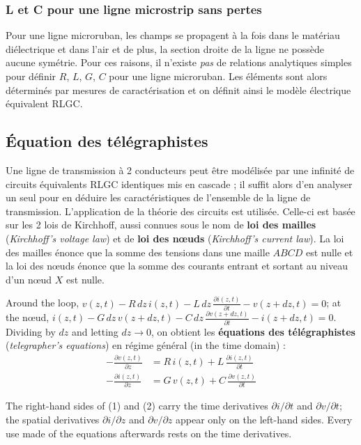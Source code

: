 \subsubsection{L et C pour une ligne microstrip sans pertes}
Pour une ligne microruban, les champs se propagent à la fois dans le matériau
diélectrique et dans l'air et de plus, la section droite de la ligne ne possède
aucune symétrie. Pour ces raisons, il n'existe \emph{pas} de relations
analytiques simples pour définir $R$, $L$, $G$, $C$ pour une ligne microruban.
Les éléments sont alors déterminés par mesures de caractérisation et on définit
ainsi le modèle électrique équivalent RLGC.

\subsection{Équation des télégraphistes}
Une ligne de transmission à 2 conducteurs peut être modélisée par une infinité
de circuits équivalents RLGC identiques mis en cascade ; il suffit alors d'en
analyser un seul pour en déduire les caractéristiques de l'ensemble de la ligne
de transmission. L'application de la théorie des circuits est utilisée.
Celle-ci est basée sur les 2 lois de Kirchhoff, aussi connues sous le nom de
\textbf{loi des mailles} (\textit{Kirchhoff's voltage law}) et de \textbf{loi
des nœuds} (\textit{Kirchhoff's current law}). La loi des mailles énonce que la
somme des tensions dans une maille $ABCD$ est nulle et la loi des nœuds énonce
que la somme des courants entrant et sortant au niveau d'un nœud $X$ est nulle.

Around the loop,
$v(z,t) - R\,dz\,i(z,t) - L\,dz\,\frac{\partial i(z,t)}{\partial t}
- v(z+dz,t) = 0$; at the nœud,
$i(z,t) - G\,dz\,v(z+dz,t) - C\,dz\,\frac{\partial v(z+dz,t)}{\partial t}
- i(z+dz,t) = 0$. Dividing by $dz$ and letting $dz \to 0$, on obtient les
\textbf{équations des télégraphistes} (\textit{telegrapher's equations}) en
régime général (in the time domain) :
\begin{align}
  -\frac{\partial v(z,t)}{\partial z}
    &= R\, i(z,t) + L\,\frac{\partial i(z,t)}{\partial t} \tag{1}\\
  -\frac{\partial i(z,t)}{\partial z}
    &= G\, v(z,t) + C\,\frac{\partial v(z,t)}{\partial t} \tag{2}
\end{align}

\begin{remark}
  The right-hand sides of (1) and (2) carry the time derivatives
  $\partial i/\partial t$ and $\partial v/\partial t$; the spatial derivatives
  $\partial i/\partial z$ and $\partial v/\partial z$ appear only on the
  left-hand sides. Every use made of the equations afterwards rests on the time
  derivatives.
\end{remark}

